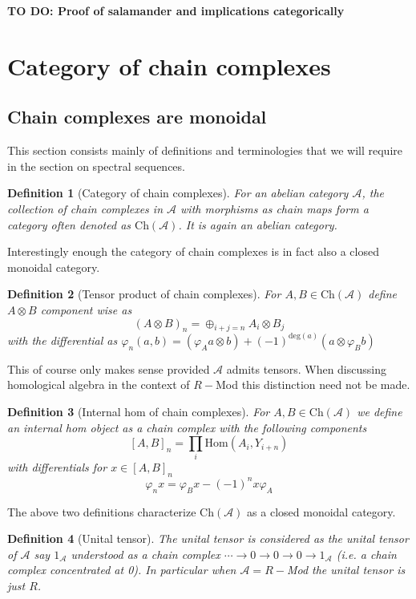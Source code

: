 \documentclass[12pt]{article}
\numberwithin{equation}{section}
\newtheorem{definition}{Definition}[section]
\begin{document}
	
	\textbf{TO DO: Proof of salamander and implications categorically}
	\section{Category of chain complexes}
	\subsection{Chain complexes are monoidal}
	This section consists mainly of definitions and terminologies that we will require in the section on spectral sequences.
	\begin{definition}[Category of chain complexes]
		For an abelian category $\mathcal{A}$, the collection of chain complexes in $\mathcal{A}$ with morphisms as chain maps form a category often denoted as $\mathrm{Ch}(\mathcal{A})$. It is again an abelian category.
	\end{definition}
	Interestingly enough the category of chain complexes is in fact also a closed monoidal category.
	
	\begin{definition}[Tensor product of chain complexes]\label{tensorchain}
		For $A, B \in \mathrm{Ch}(\mathcal{A})$ define $A \otimes B$ component wise as \[ (A \otimes B)_n = \oplus_{i+j=n} A_i \otimes B_j\] with the differential as $ \varphi_n(a,b)=(\varphi_Aa\otimes b)+(-1)^{\mathrm{deg}(a)}(a \otimes \varphi_B b)$
	\end{definition}
	This of course only makes sense provided $\mathcal{A}$ admits tensors. When discussing homological algebra in the context of $R-$Mod this distinction need not be made.
	
	\begin{definition}[Internal hom of chain complexes]\label{internalchain}
		For $A,B \in \mathrm{Ch}(\mathcal{A})$ we define an internal hom object as a chain complex with the following components
		\[ [A,B]_n=\prod_i \mathrm{Hom}(A_i,Y_{i+n})\]
		with differentials for $x \in [A,B]_n$
		\[ \varphi_n x= \varphi_B x-(-1)^n x \varphi_A \]
	\end{definition}
	The above two definitions characterize $\mathrm{Ch}(\mathcal{A})$ as a closed monoidal category. 
	\begin{definition}[Unital tensor]\label{chunittensor}
			The unital tensor is considered as the unital tensor of $\mathcal{A}$ say $1_\mathcal{A}$ understood as a chain complex $\cdots \to 0\to0 \to 0 \to 1_\mathcal{A}$ (i.e. a chain complex concentrated at 0). In particular when $\mathcal{A}=R-$Mod the unital tensor is just $R$.
	\end{definition}
\end{document}
